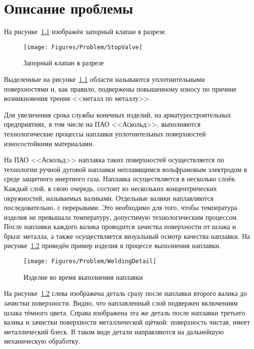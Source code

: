 \chapter{Описание проблемы}
На рисунке~\ref{fig:Problem:StopValve} изображён запорный клапан в разрезе.

\begin{figure}[H]
    \centering
    \vspace{14pt}
    \texttt{[image: Figures/Problem/StopValve]}
    \caption{Запорный клапан в разрезе}
    \label{fig:Problem:StopValve}
\end{figure}

Выделенные на рисунке~\ref{fig:Problem:StopValve} области называются уплотнительными поверхностями и, как правило, подвержены повышенному износу по причине возникновения трения <<металл по металлу>>.

Для увеличения срока службы конечных изделий, на арматуростроительных предприятиях, в том числе на ПАО <<Аскольд>>, выполняются технологические процессы наплавки уплотнительных поверхностей износостойкими материалами.

На ПАО <<Аскольд>> наплавка таких поверхностей осуществляется по технологии ручной дуговой наплавки неплавящимся вольфрамовым электродом в среде защитного инертного газа.
Наплавка осуществляется в несколько слоёв.
Каждый слой, в свою очередь, состоит из нескольких концентрических окружностей, называемых валиками.
Отдельные валики наплавляются последовательно, с перерывами.
Это необходимо для того, чтобы температура изделия не превышала температуру, допустимую технологическим процессом.
После наплавки каждого валика проводится зачистка поверхности от шлака и брызг металла, а также осуществляется визуальный осмотр качества наплавки.
На рисунке~\ref{fig:Problem:WeldingDetail} приведён пример изделия в процессе выполнения наплавки.

\begin{figure}[H]
    \centering
    \vspace{14pt}
    \texttt{[image: Figures/Problem/WeldingDetail]}
    \caption{Изделие во время выполнения наплавки}
    \label{fig:Problem:WeldingDetail}
\end{figure}

На рисунке~\ref{fig:Problem:WeldingDetail} слева изображена деталь сразу после наплавки второго валика до зачистки поверхности.
Видно, что наплавленный слой подвержен включениям шлака тёмного цвета.
Справа изображена эта же деталь после наплавки третьего валика и зачистки поверхности металлической щёткой: поверхность чистая, имеет металлический блеск.
В таком виде детали направляются на дальнейшую механическую обработку.

